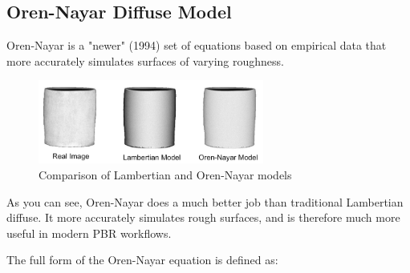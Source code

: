 \documentclass[12pt,letterpaper]{article}
\begin{document}
\subsection{Oren-Nayar Diffuse Model}

Oren-Nayar is a "newer" (1994) set of equations based on empirical data that more accurately simulates surfaces of varying roughness.

\begin{figure}[htbp]
    \centering
    \includegraphics[width=20em]{Oren-nayar-vase2}
    \caption{Comparison of Lambertian and Oren-Nayar models}
    \label{fig:lambert_orennayar_comparison}
\end{figure}

As you can see, Oren-Nayar does a much better job than traditional Lambertian diffuse. 
It more accurately simulates rough surfaces, and is therefore much more useful in modern PBR workflows.

The full form of the Oren-Nayar equation is defined as:
\end{document}
